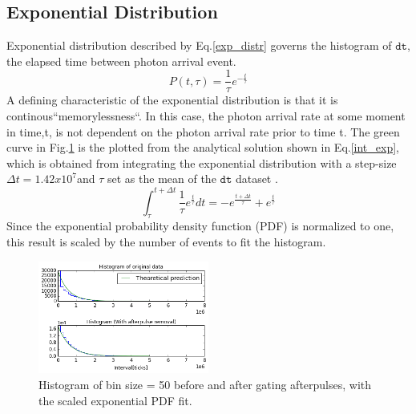\documentclass[authoryear, 12pt,5p, Times]{elsarticle}
\begin{document}
 	\subsection{Exponential Distribution}
 	Exponential distribution described by Eq.\ref{exp_distr} governs the histogram of $\texttt{dt}$, the elapsed time between photon arrival event.
\begin{equation} \label{exp_distr}
 P(t,\tau)=\frac{1}{\tau}e^{-\frac{t}{\tau}}
\end{equation}
 	 A defining characteristic of the exponential distribution is that it is continous``memorylessness``. In this case, the photon arrival rate at some moment in time,t, is not dependent on the photon arrival rate prior to time t.  The green curve in Fig.\ref{fitted_histo_gate_or_no} is the plotted from the analytical solution shown in Eq.\ref{int_exp}, which is obtained from integrating the exponential distribution with a step-size $\Delta t =1.42x10^7$and  $\tau$ set as the mean of the $\texttt{dt}$ dataset .  
 	 \begin{equation}\label{int_exp}
 	 \int^{t+\Delta t}_\tau\frac{1}{\tau}e^\frac{t}{\tau}dt=-e^\frac{t+\Delta t}{\tau}+e^\frac{t}{\tau}
	\end{equation} 	  
Since the exponential probability density function (PDF) is normalized to one, this result is scaled by the number of events to fit the histogram.
 	\begin{figure}[h]
		\includegraphics[width=0.5\textwidth]{figures/histogram}
		\caption{Histogram of bin size = 50 before and after gating afterpulses, with the scaled exponential PDF fit.}
		\label{fitted_histo_gate_or_no}
	\end{figure}
\end{document}
